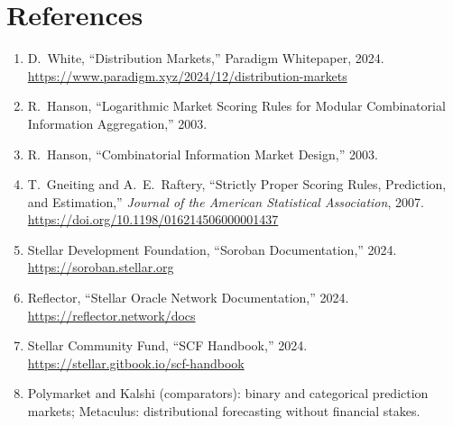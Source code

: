 \documentclass{portalciencia}
\newcommand{\reflink}[1]{\href{#1}{\footnotesize\url{#1}}}
\begin{document}
\section{References}

\begin{enumerate}
  \item D.~White, ``Distribution Markets,'' Paradigm Whitepaper, 2024. \reflink{https://www.paradigm.xyz/2024/12/distribution-markets}

  \item R.~Hanson, ``Logarithmic Market Scoring Rules for Modular Combinatorial Information Aggregation,'' 2003.

  \item R.~Hanson, ``Combinatorial Information Market Design,'' 2003.

  \item T.~Gneiting and A.~E.~Raftery, ``Strictly Proper Scoring Rules, Prediction, and Estimation,'' \emph{Journal of the American Statistical Association}, 2007. \reflink{https://doi.org/10.1198/016214506000001437}

  \item Stellar Development Foundation, ``Soroban Documentation,'' 2024. \reflink{https://soroban.stellar.org}

  \item Reflector, ``Stellar Oracle Network Documentation,'' 2024. \reflink{https://reflector.network/docs}

  \item Stellar Community Fund, ``SCF Handbook,'' 2024. \reflink{https://stellar.gitbook.io/scf-handbook}

  \item Polymarket and Kalshi (comparators): binary and categorical prediction markets; Metaculus: distributional forecasting without financial stakes.
\end{enumerate}
\end{document}
